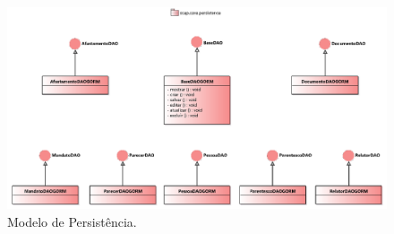 \begin{figure}[h]
	\centering
	\includegraphics[width=1\textwidth]{figuras/figura-arquitetura-persistencia.png}
	\caption{Modelo de Persistência.}
	\label{figura-arquitetura-persistencia}
\end{figure}


